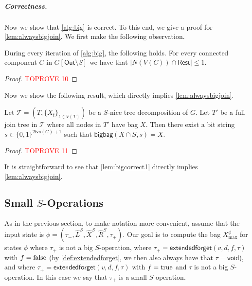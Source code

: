 \documentclass[a4paper,UKenglish,cleveref, autoref, thm-restate, numberwithinsect]{lipics-v2021}
\newcommand{\fvn}{\mathsf{fvn}}
\newcommand{\extendedforget}{\mathsf{extendedforget}}
\newcommand{\void}{\mathsf{void}}
\newcommand{\bigbag}{\mathsf{bigbag}}
\newcommand{\true}{\textup{true}}
\newcommand{\false}{\textup{false}}
\newcommand{\slim}{\text{slim}\xspace}
\newcommand{\Out}{\mathsf{Out}}
\newcommand{\Rest}{\mathsf{Rest}}
\begin{document}
\subparagraph{Correctness.}
Now we show that \cref{alg:big} is correct. To this end, we give a proof for \cref{lem:alwaysbigjoin}.
We first make the following observation.



\begin{lemma}\label{lem:oneneighborbig}
During every iteration of \cref{alg:big}, the following holds. For every connected component $C$ in $G[\Out\setminus S]$ we have that $|N(V(C))\cap \Rest|\le 1$.
\end{lemma}
\begin{proof}\textcolor{red}{TOPROVE 10}\end{proof}

Now we show the following result, which directly implies \cref{lem:alwaysbigjoin}.

\begin{lemma}\label{lem:bigcorrect1}
Let $\mathcal{T}=(T,\{X_t\}_{t\in V(T)})$ be a \slim $S$-nice tree decomposition of $G$. Let $T'$ be a full join tree in $\mathcal{T}$ where all nodes in $T'$ have bag $X$. Then there exist a bit string $s\in \{0,1\}^{2\fvn(G)+1}$ such that $\bigbag(X\cap S,s)=X$.
\end{lemma}
\begin{proof}\textcolor{red}{TOPROVE 11}\end{proof}

It is straightforward to see that \cref{lem:bigcorrect1} directly implies \cref{lem:alwaysbigjoin}.




\subsection{Small \boldmath$S$-Operations}\label{sec:smallops}
As in the previous section, to make notation more convenient, assume that the input state is $\phi=(\tau_-,\hat{L}^S, \hat{X}^S, \hat{R}^S,\tau_+)$. 
Our goal is to compute the bag $X^\phi_{\max}$ for states $\phi$ where $\tau_+$ is not a big $S$-operation, where $\tau_+=\extendedforget(v,d,f,\tau)$ with $f=\false$ (by \cref{def:extendedforget}, we then also always have that $\tau=\void$), and where $\tau_+=\extendedforget(v,d,f,\tau)$ with $f=\true$ and $\tau$ is not a big $S$-operation. 
In this case we say that $\tau_+$ is a small $S$-operation. 
\end{document}
